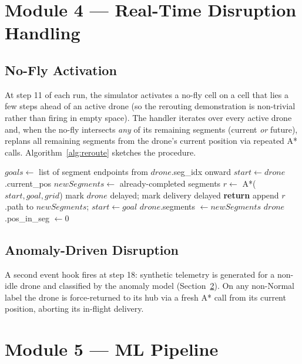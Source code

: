 \documentclass[11pt,a4paper]{article}
\begin{document}
\section{Module 4 --- Real-Time Disruption Handling}
\label{sec:disrupt}

\subsection{No-Fly Activation}
At step 11 of each run, the simulator activates a no-fly cell on a cell
that lies a few steps ahead of an active drone (so the rerouting
demonstration is non-trivial rather than firing in empty space). The
handler iterates over every active drone and, when the no-fly intersects
\emph{any} of its remaining segments (current \emph{or} future), replans
all remaining segments from the drone's current position via repeated A*
calls. Algorithm~\ref{alg:reroute} sketches the procedure.

\begin{algorithm}[H]
\caption{\textsc{Reroute}(drone, grid)}
\label{alg:reroute}
\begin{algorithmic}[1]
\State $goals \gets$ list of segment endpoints from $drone$.seg\_idx onward
\State $start \gets drone$.current\_pos
\State $newSegments \gets$ already-completed segments
  \State $r \gets$ \textsc{A*}($start, goal, grid$)
    \State mark $drone$ delayed; mark delivery delayed
    \State \textbf{return}
  \EndIf
  \State append $r$.path to $newSegments$; $start \gets goal$
\EndFor
\State $drone$.segments $\gets newSegments$
\State $drone$.pos\_in\_seg $\gets 0$
\end{algorithmic}
\end{algorithm}

\subsection{Anomaly-Driven Disruption}
A second event hook fires at step 18: synthetic telemetry is generated
for a non-idle drone and classified by the anomaly model
(Section~\ref{sec:ml}). On any non-Normal label the drone is force-returned
to its hub via a fresh A* call from its current position, aborting its
in-flight delivery.

\section{Module 5 --- ML Pipeline}
\label{sec:ml}
\end{document}
